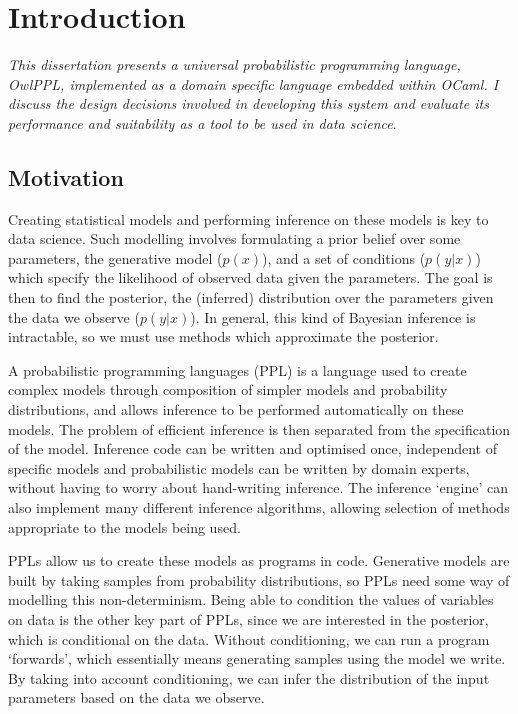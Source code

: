 \chapter{Introduction}

\textit{This dissertation presents a universal probabilistic programming language, OwlPPL, implemented as a domain specific language embedded within OCaml. I discuss the design decisions involved in developing this system and evaluate its performance and suitability as a tool to be used in data science}.

\section{Motivation}
Creating statistical models and performing inference on these models is key to data science. Such modelling involves formulating a prior belief over some parameters, the generative model ($p(x)$), and a set of conditions ($p(y|x)$) which specify the likelihood of observed data given the parameters. The goal is then to find the posterior, the (inferred) distribution over the parameters given the data we observe ($p(y|x)$). In general, this kind of Bayesian inference is intractable, so we must use methods which approximate the posterior.

A probabilistic programming languages (PPL) is a language used to create complex models through composition of simpler models and probability distributions, and allows inference to be performed automatically on these models. The problem of efficient inference is then separated from the specification of the model. Inference code can be written and optimised once, independent of specific models and probabilistic models can be written by domain experts, without having to worry about hand-writing inference. The inference `engine' can also implement many different inference algorithms, allowing selection of methods appropriate to the models being used.

PPLs allow us to create these models as programs in code. Generative models are built by taking samples from probability distributions, so PPLs need some way of modelling this non-determinism. Being able to condition the values of variables on data is the other key part of PPLs, since we are interested in the posterior, which is conditional on the data. Without conditioning, we can run a program `forwards', which essentially means generating samples using the model we write. By taking into account conditioning, we can infer the distribution of the input parameters based on the data we observe.

